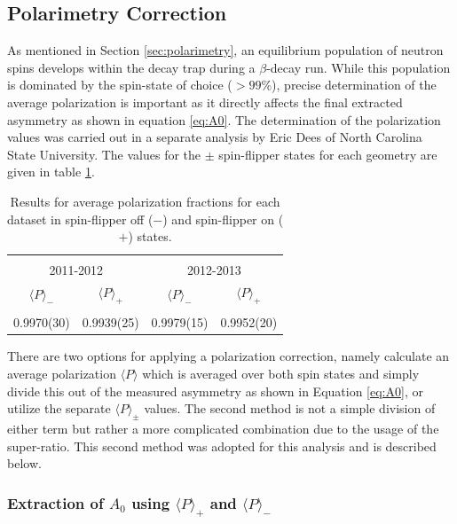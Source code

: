 \subsection{Polarimetry Correction} \label{ssec:polCorr}

As mentioned in Section \ref{sec:polarimetry}, an equilibrium population of neutron
spins develops within the decay trap during a $\beta$-decay run. While this population is
dominated by the spin-state of choice ($>99\%$), precise determination of the average
polarization is important as it directly affects the final extracted asymmetry as shown in
equation \ref{eq:A0}. The determination of the polarization values was carried
out in a separate analysis by Eric Dees of North Carolina State University.
The values for the $\pm$ spin-flipper states for
each geometry are given in table \ref{tab:pol}.

\setlength{\tabcolsep}{12pt}
\begin{table}[h]
  \caption{Results for average polarization fractions for each dataset in spin-flipper off ($-$)
    and spin-flipper on ($+$) states.} 
  \centering
  \begin{tabular}{c c c c}
    \hline \hline \\ [-1.75ex]
    \multicolumn{2}{c}{2011-2012}&\multicolumn{2}{c}{2012-2013} \\ [0.5ex]
    $\langle P \rangle_-$ & $\langle P \rangle_+$ & $\langle P \rangle_-$ & $\langle P\rangle_+$ \\ [0.25ex]
    \hline \\ [-1.75ex]
    0.9970(30) & 0.9939(25) & 0.9979(15) & 0.9952(20) \\ [0.25ex]
    \hline
  \end{tabular}
  \label{tab:pol}
\end{table}

There are two options for applying a polarization correction, namely
calculate an average polarization $\langle P \rangle$
which is averaged over both spin states and simply
divide this out of the measured asymmetry as shown in Equation \ref{eq:A0}, or utilize the
separate $\langle P\rangle_\pm$ values. The second method is not a simple division of
either term but rather a more complicated combination due to the usage of the super-ratio.
This second method was adopted for this analysis and is described below.

\subsubsection{Extraction of $A_0$ using $\langle P \rangle_+$ and $\langle P \rangle_-$}
\label{ssec:polSep}

